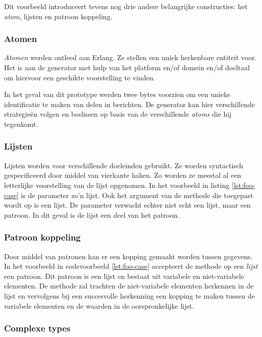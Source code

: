 Dit voorbeeld introduceert tevens nog drie andere belangrijke constructies: het
\emph{atom}, lijsten en patroon koppeling.

\subsubsection{Atomen}

\emph{Atomen} werden ontleed aan Erlang. Ze stellen een uniek herkenbare
entiteit voor. Het is aan de generator met hulp van het platform en/of domein
en/of doeltaal om hiervoor een geschikte voorstelling te vinden.

In het geval van dit prototype werden twee bytes voorzien om een unieke
identificatie te maken van delen in berichten. De generator kan hier
verschillende strategie\"en volgen en beslissen op basis van de verschillende
\emph{atoms} die hij tegenkomt.

\subsubsection{Lijsten}

Lijsten worden voor verschillende doeleinden gebruikt. Ze worden syntactisch
gespecificeerd door middel van vierkante haken. Zo worden ze meestal al een
letterlijke voorstelling van de lijst opgenomen. In het voorbeeld in listing
\ref{lst:foo-case} is de  parameter zo'n lijst. Ook het argument
van de  methode die toegepast wordt op  is een
lijst. De parameter verwacht echter niet echt een lijst, maar een patroon. In
dit geval is de lijst een deel van het patroon.

\subsubsection{Patroon koppeling}

Door middel van patronen kan er een kopping gemaakt worden tussen gegevens. In
het voorbeeld in codevoorbeeld \ref{lst:foo-case} accepteert de 
methode op een \emph{lijst} een patroon. Dit patroon is een lijst en bestaat
uit variabele en niet-variabele elementen. De  methode zal
trachten de niet-variabele elementen herkennen in de lijst en vervolgens bij
een succesvolle herkenning een kopping te maken tussen de variabele elementen
en de waarden in de oorspronkelijke lijst.

\subsubsection{Complexe types}

